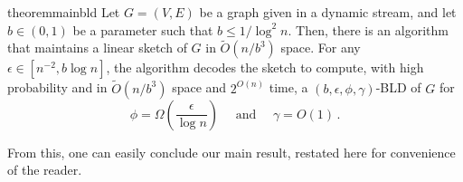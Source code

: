 \documentclass[epsfig,letter,11pt]{article}
\numberwithin{equation}{section}
\newcommand{\otil}{\tilde{O}}
\renewcommand{\tilde}{\widetilde}
\begin{document}
\begin{restatable}{theorem}{mainbld}
	\label{th:main}
	Let $G=(V, E)$ be a graph given in a dynamic stream, and let $b \in (0,1)$ be a parameter such that $b \le 1/\log^2 n$. Then, there is an algorithm that maintains a linear sketch of $G$ in $\otil(n/b^3)$ space. For any $\epsilon \in [n^{-2}, b \log n]$, the algorithm decodes the sketch to compute, with high probability and in $\otil(n/b^3)$ space and $2^{O(n)}$ time, a $(b, \epsilon, \phi, \gamma)$-BLD of $G$ for
	\begin{equation*}
		\phi = \Omega\left(\frac{\epsilon}{\log n}\right) \quad \text{ and } \quad \gamma = O(1) \, .
	\end{equation*}
\end{restatable}
\noindent
From this, one can easily conclude our main result, restated here for convenience of the reader.
\end{document}
